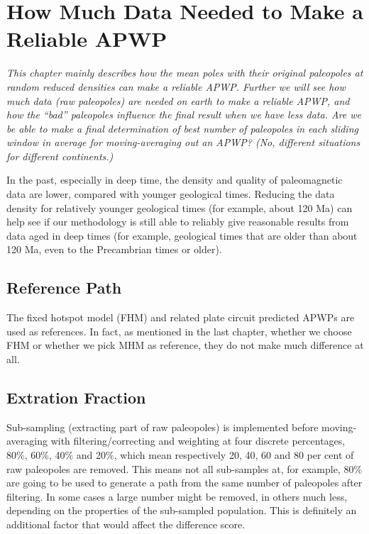 \chapter{How Much Data Needed to Make a Reliable APWP}\label{chap:DatNeed}
\textit{This chapter mainly describes how the mean poles with their original
paleopoles at random reduced densities can make a reliable APWP\@. Further we
will see how much data (raw paleopoles) are needed on earth to make a reliable
APWP, and how the ``bad'' paleopoles influence the final result when we have
less data. Are we be able to make a final determination of best number of
paleopoles in each sliding window in average for moving-averaging out an APWP?
(No, different situations for different continents.)}
\vfill
\minitoc\newpage

In the past, especially in deep time, the density and quality of paleomagnetic
data are lower, compared with younger geological times. Reducing the data
density for relatively younger geological times (for example, about
120 Ma) can help see if our methodology is still able to reliably
give reasonable results from data aged in deep times (for example, geological
times that are older than about 120 Ma, even to the Precambrian times or older).

\section{Reference Path}

The fixed hotspot model (FHM) and related plate circuit predicted APWPs are used
as references. In fact, as mentioned in the last chapter, whether we choose FHM
or whether we pick MHM as reference, they do not make much difference at all.

\section{Extration Fraction}

Sub-sampling (extracting part of raw paleopoles) is implemented before
moving-averaging with filtering/correcting and weighting at four discrete
percentages, 80\%, 60\%, 40\% and 20\%, which mean respectively 20, 40, 60 and
80 per cent of raw paleopoles are removed. This means not all sub-samples at,
for example, 80\% are going to be used to generate a path from the same number
of paleopoles after filtering. In some cases a large number might be removed, in
others much less, depending on the properties of the sub-sampled population.
This is definitely an additional factor that would affect the difference score.

